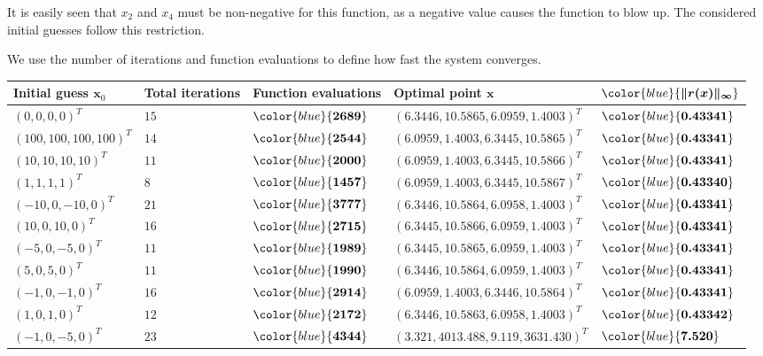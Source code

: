 \documentclass[12pt, a4paper]{article}
\newcommand{\bs}[1]{{\color{blue}{\boldsymbol{#1}}}}
\newcommand{\bx}{\boldsymbol{x}}
\begin{document}
It is easily seen that $x_2$ and $x_4$ must be non-negative for this function, as a negative value causes the function to blow up. The considered initial guesses follow this restriction.

We use the number of iterations and function evaluations to define how fast the system converges. 

\begin{center}
\bgroup
\def\arraystretch{1.4}
{\small
\begin{tabular}%
  {|>{\raggedright\arraybackslash}p{2cm}%
    >{\raggedleft\arraybackslash}p{1.6cm}%
    >{\raggedright\arraybackslash}p{1cm}%
    >{\raggedleft\arraybackslash}p{5.7cm}%
    >{\raggedright\arraybackslash}p{1.55cm}|}
  \hline
  Initial guess $\bx_0$ & Total iterations & Function \mbox{evaluations} & Optimal point $\bx$ & $\bs{\Vert r(\bx) \Vert_{\infty}}$\\  

  \hline
  ${(0,0,0,0)}^T$ & $15$ & $\bs{2689}$ & ${(6.3446, 10.5865, 6.0959, 1.4003)}^T$ & $\bs{0.43341}$\\
  ${(100, 100, 100, 100)}^T$ & $14$ & $\bs{2544}$ & ${(6.0959, 1.4003, 6.3445, 10.5865)}^T$ & $\bs{0.43341}$ \\
  ${(10, 10, 10, 10)}^T$ & $11$ & $\bs{2000}$ & ${(6.0959, 1.4003, 6.3445, 10.5866)}^T$ & $\bs{0.43341}$\\
  ${(1, 1, 1, 1)}^T$ & $8$ & $\bs{1457}$ & ${(6.0959, 1.4003, 6.3445, 10.5867)}^T$ & $\bs{0.43340}$ \\
  ${(-10, 0, -10, 0)}^T$ & $21$ & $\bs{3777}$ & ${(6.3446, 10.5864, 6.0958, 1.4003)}^T$ & $\bs{0.43341}$\\
  ${(10, 0, 10, 0)}^T$ & $16$ & $\bs{2715}$ & ${(6.3445, 10.5866, 6.0959, 1.4003)}^T$ &$\bs{0.43341}$ \\
  ${(-5, 0, -5, 0)}^T$ & $11$ & $\bs{1989}$ & ${(6.3445, 10.5865, 6.0959, 1.4003)}^T$ & $\bs{0.43341}$\\
  ${(5, 0, 5, 0)}^T$ & $11$ & $\bs{1990}$ & ${(6.3446, 10.5864, 6.0959, 1.4003)}^T$ & $\bs{0.43341}$\\
  ${(-1, 0, -1, 0)}^T$ & $16$ & $\bs{2914}$ & ${(6.0959, 1.4003, 6.3446, 10.5864)}^T$ & $\bs{0.43341}$\\
  ${(1, 0, 1, 0)}^T$ & $12$ & $\bs{2172}$ & ${(6.3446, 10.5863, 6.0958, 1.4003)}^T$ & $\bs{0.43342}$\\
  ${(-1, 0, -5, 0)}^T$ & $23$ & $\bs{4344}$ & ${(3.321, 4013.488, 9.119, 3631.430)}^T$ & $\bs{7.520}$\\
  \hline
\end{tabular}
}
\egroup\end{center}
\end{document}
